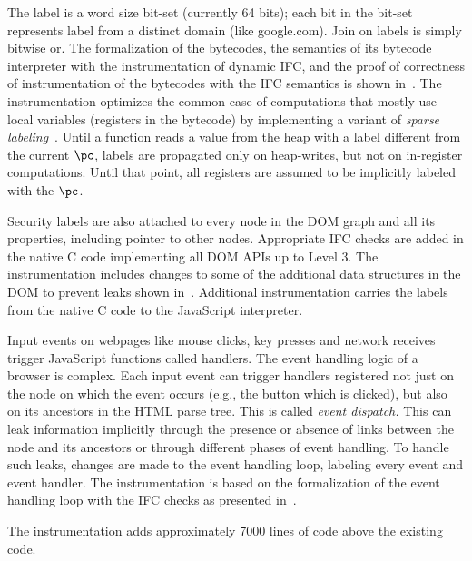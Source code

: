 The label is a word size bit-set (currently 64 
bits); each bit in the bit-set represents label from a distinct domain
(like google.com). Join on labels is simply bitwise or. The
formalization of the bytecodes, the semantics of its bytecode
interpreter with the instrumentation of dynamic IFC, and the proof of
correctness of instrumentation of the bytecodes with the IFC 
semantics is shown in~\cite{post14Extended}. The instrumentation
optimizes the common case of computations that mostly use local
variables (registers in the bytecode) by implementing a variant of
\emph{sparse labeling}~\cite{plas09}. Until a function reads a value
from the heap with a label different from the current $\pc$, labels  
are propagated only on heap-writes, but not on in-register
computations. Until that point, all registers are assumed to be
implicitly labeled with the $\pc$. 

Security labels are also attached to every node in the DOM graph and
all its properties, including pointer to other nodes. Appropriate 
IFC checks are added in the native C code implementing all DOM APIs up
to Level 3. The instrumentation includes changes to some of the
additional data structures in the DOM to prevent leaks shown
in~\cite{csf15}. Additional instrumentation carries the labels from the
native C code to the JavaScript interpreter. 

Input events on webpages like mouse clicks, key presses and network
receives trigger JavaScript functions called handlers. The event
handling logic of a browser is complex. Each input event can trigger
handlers registered not just on the node on which the event occurs
(e.g., the button which is clicked), but also on its ancestors in the
HTML parse tree. This is called \emph{event dispatch.} 
This can leak information implicitly through the
presence or absence of links between the node and its ancestors or
through different phases of event handling. To handle such leaks,
changes are made to the event handling loop, labeling every event and
event handler. The instrumentation is based on the formalization of
the event handling loop with the IFC checks as presented in~\cite{csf15}. 

The instrumentation adds approximately 7000 lines of code above the
existing code.  


